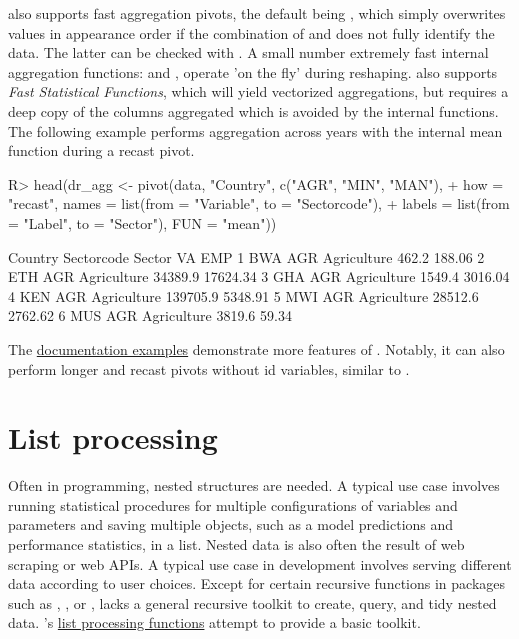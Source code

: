 \documentclass[nojss]{jss} %
\newcommand{\fct}[1]{\code{#1()}}
\begin{document}
\fct{pivot} also supports fast aggregation pivots, the default being , which simply overwrites values in appearance order if the combination of  and  does not fully identify the data. The latter can be checked with . A small number extremely fast internal aggregation functions:  and , operate 'on the fly' during reshaping. \fct{pivot} also supports \emph{Fast Statistical Functions}, which will yield vectorized aggregations, but requires a deep copy of the columns aggregated which is avoided by the internal functions. The following example performs aggregation across years with the internal mean function during a recast pivot.
\begin{Schunk}
\begin{Sinput}
R> head(dr_agg <- pivot(data, "Country", c("AGR", "MIN", "MAN"),
+    how = "recast", names = list(from = "Variable", to = "Sectorcode"),
+    labels = list(from = "Label", to = "Sector"), FUN = "mean"))
\end{Sinput}
\begin{Soutput}
  Country Sectorcode      Sector       VA      EMP
1     BWA        AGR Agriculture    462.2   188.06
2     ETH        AGR Agriculture  34389.9 17624.34
3     GHA        AGR Agriculture   1549.4  3016.04
4     KEN        AGR Agriculture 139705.9  5348.91
5     MWI        AGR Agriculture  28512.6  2762.62
6     MUS        AGR Agriculture   3819.6    59.34
\end{Soutput}
\end{Schunk}
The \href{https://sebkrantz.github.io/collapse/reference/pivot.html#ref-examples}{documentation examples} demonstrate more features of \fct{pivot}. Notably, it can also perform longer and recast pivots without id variables, similar to .
%
\section{List processing} \label{sec:list_proc}
%
Often in programming, nested structures are needed. A typical use case involves running statistical procedures for multiple configurations of variables and parameters and saving multiple objects, such as a model predictions and performance statistics, in a list. Nested data is also often the result of web scraping or web APIs. A typical use case in development involves serving different data according to user choices. Except for certain recursive functions in packages such as , , or ,  lacks a general recursive toolkit to create, query, and tidy nested data. 's \href{https://sebkrantz.github.io/collapse/reference/list-processing.html}{list processing functions} attempt to provide a basic toolkit. \newline
\end{document}

